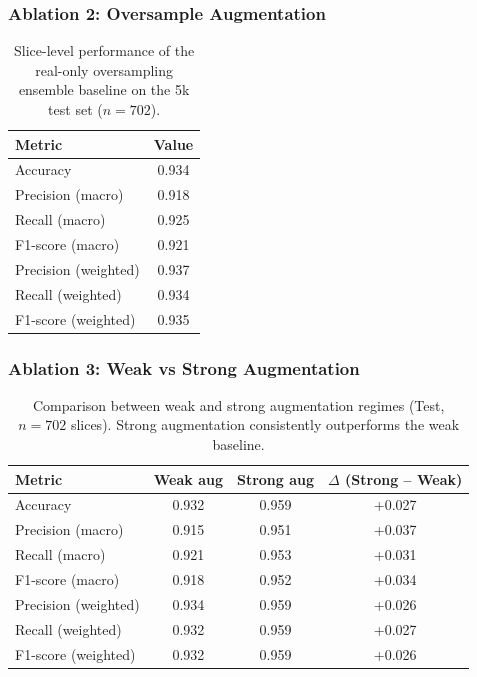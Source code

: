 \subsubsection{Ablation 2: Oversample Augmentation}

\begin{table}[H]
\centering
\caption{Slice-level performance of the real-only oversampling ensemble baseline on the 5k test set ($n = 702$).}
\begin{tabular}{lc}
\toprule
Metric & Value \\
\midrule
Accuracy             & 0.934 \\
Precision (macro)    & 0.918 \\
Recall (macro)       & 0.925 \\
F1-score (macro)     & 0.921 \\
Precision (weighted) & 0.937 \\
Recall (weighted)    & 0.934 \\
F1-score (weighted)  & 0.935 \\
\bottomrule
\end{tabular}
\label{tab:exp2c_b1_oversample}
\end{table}



\subsubsection{Ablation 3: Weak vs Strong Augmentation}


\begin{table}[H]
\centering
\caption{Comparison between weak and strong augmentation regimes (Test, $n = 702$ slices). Strong augmentation consistently outperforms the weak baseline.}
\begin{tabular}{lccc}
\toprule
Metric & Weak aug & Strong aug & $\Delta$ (Strong -- Weak) \\
\midrule
Accuracy             & 0.932 & 0.959 & +0.027 \\
Precision (macro)    & 0.915 & 0.951 & +0.037 \\
Recall (macro)       & 0.921 & 0.953 & +0.031 \\
F1-score (macro)     & 0.918 & 0.952 & +0.034 \\
Precision (weighted) & 0.934 & 0.959 & +0.026 \\
Recall (weighted)    & 0.932 & 0.959 & +0.027 \\
F1-score (weighted)  & 0.932 & 0.959 & +0.026 \\
\bottomrule
\end{tabular}
\label{tab:exp2c_b2_weak_vs_strong}
\end{table}










